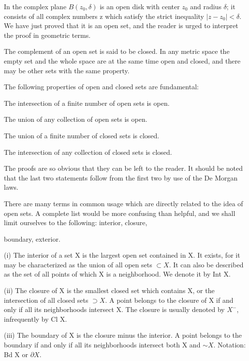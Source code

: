 In the complex plane $B(z_{0},\delta)$ is an open disk with center $z_{0}$ and radius $\delta$; it consists of all complex numbers z which satisfy the strict inequality $|z - z_{0}| < \delta$. We have just proved that it is an open set, and the reader is urged to interpret the proof in geometric terms.

The complement of an open set is said to be closed. In any metric space the empty set and the whole space are at the same time open and closed, and there may be other sets with the same property.

The following properties of open and closed sets are fundamental:

The intersection of a finite number of open sets is open.

The union of any collection of open sets is open.

The union of a finite number of closed sets is closed.

The intersection of any collection of closed sets is closed.

The proofs are so obvious that they can be left to the reader. It should be noted that the last two statements follow from the first two by use of the De Morgan laws.

There are many terms in common usage which are directly related to the idea of open sets. A complete list would be more confusing than helpful, and we shall limit ourselves to the following: interior, closure,


boundary, exterior.

(i) The interior of a set X is the largest open set contained in X. It exists, for it may be characterized as the union of all open sets $\subset X$. It can also be described as the set of all points of which X is a neighborhood. We denote it by Int X.

(ii) The closure of X is the smallest closed set which contains X, or the intersection of all closed sets $\supset X$. A point belongs to the closure of X if and only if all its neighborhoods intersect X. The closure is usually denoted by $X^{-}$, infrequently by Cl X.

(iii) The boundary of X is the closure minus the interior. A point belongs to the boundary if and only if all its neighborhoods intersect both X and $\sim X$. Notation: Bd X or $\partial X$.

